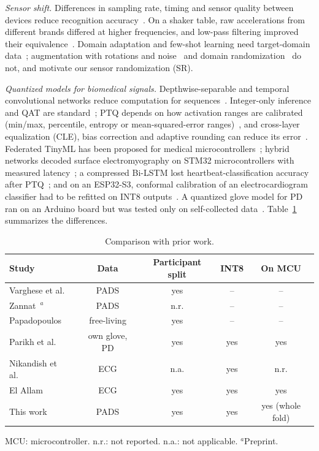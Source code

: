 \documentclass[preprint,12pt]{elsarticle}
\begin{document}
\emph{Sensor shift.} Differences in sampling rate, timing and sensor quality between devices reduce recognition accuracy~\cite{Stisen2015}. On a shaker table, raw accelerations from different brands differed at higher frequencies, and low-pass filtering improved their equivalence~\cite{CoyleAsbil2026}. Domain adaptation and few-shot learning need target-domain data~\cite{Zhu2025,Zheng2026}; augmentation with rotations and noise~\cite{Um2017} and domain randomization~\cite{Tobin2017} do not, and motivate our sensor randomization (SR).

\emph{Quantized models for biomedical signals.} Depthwise-separable and temporal convolutional networks reduce computation for sequences~\cite{Howard2017,Bai2018}. Integer-only inference and QAT are standard~\cite{Jacob2018,Krishnamoorthi2018}; PTQ depends on how activation ranges are calibrated (min/max, percentile, entropy or mean-squared-error ranges)~\cite{Wu2020}, and cross-layer equalization (CLE), bias correction and adaptive rounding can reduce its error~\cite{NagelDFQ2019,Nagel2020AdaRound,Nagel2021}. Federated TinyML has been proposed for medical microcontrollers~\cite{Ibrar2026}; hybrid networks decoded surface electromyography on STM32 microcontrollers with measured latency~\cite{Ortone2026}; a compressed Bi-LSTM lost heartbeat-classification accuracy after PTQ~\cite{Nikandish2026}; and on an ESP32-S3, conformal calibration of an electrocardiogram classifier had to be refitted on INT8 outputs~\cite{ElAllam2026}. A quantized glove model for PD ran on an Arduino board but was tested only on self-collected data~\cite{Parikh2026}. Table~\ref{tab:related} summarizes the differences.

\begin{table}[!t]
\caption{Comparison with prior work.}
\label{tab:related}
\centering\scriptsize\setlength{\tabcolsep}{2.5pt}
\begin{tabular*}{\linewidth}{@{\extracolsep{\fill}}lcccc@{}}
\toprule
Study & Data & Participant split & INT8 & On MCU \\
\midrule
Varghese et al.~\cite{Varghese2024} & PADS & yes & -- & -- \\
Zannat~\cite{Zannat2026}$^{a}$ & PADS & n.r. & -- & -- \\
Papadopoulos~\cite{Papadopoulos2023} & free-living & yes & -- & -- \\
Parikh et al.~\cite{Parikh2026} & own glove, PD & yes & yes & yes \\
Nikandish et al.~\cite{Nikandish2026} & ECG & n.a. & yes & n.r. \\
El Allam~\cite{ElAllam2026} & ECG & yes & yes & yes \\
This work & PADS & yes & yes & yes (whole fold) \\
\bottomrule
\end{tabular*}

\vspace{2pt}\parbox{\linewidth}{\footnotesize MCU: microcontroller. n.r.: not reported. n.a.: not applicable. $^{a}$Preprint.}
\end{table}
\end{document}
